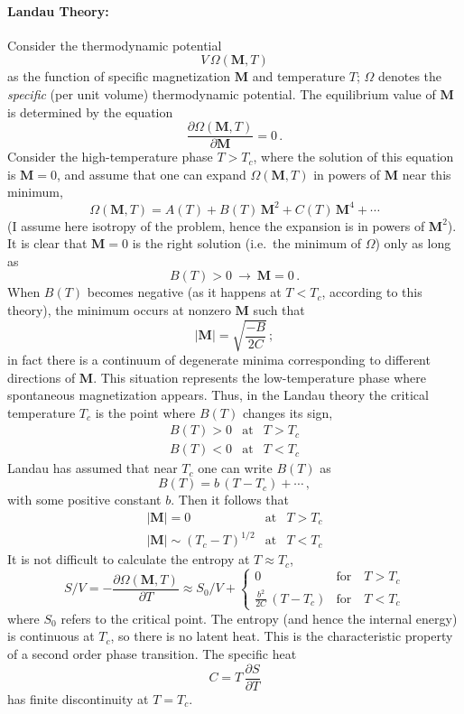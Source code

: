 \paragraph{Landau Theory:} Consider the thermodynamic potential
\[
V\,\Omega(\mathbf M,T)
\]
as the function of specific magnetization $\mathbf M$ and temperature $T$;
$\Omega$ denotes the \emph{specific} (per unit volume) thermodynamic potential.
The equilibrium value of $\mathbf M$ is determined by the equation
\[
\frac{\partial\Omega(\mathbf M,T)}{\partial\mathbf M}=0\,.
\]
Consider the high-temperature phase $T>T_c$, where the solution of this equation
is $\mathbf M=0$, and assume that one can expand $\Omega(\mathbf M,T)$ in powers
of $\mathbf M$ near this minimum,
\[
\Omega(\mathbf M,T)=A(T)+B(T)\,\mathbf M^2+C(T)\,\mathbf M^4+\cdots
\]
(I assume here isotropy of the problem, hence the expansion is in powers of
$\mathbf M^2$). It is clear that $\mathbf M=0$ is the right solution (i.e.\ the
minimum of $\Omega$) only as long as
\[
B(T)>0\ \to\ \mathbf M=0\,.
\]
When $B(T)$ becomes negative (as it happens at $T<T_c$, according to this
theory), the minimum occurs at nonzero $\mathbf M$ such that
\[
|\mathbf M|=\sqrt{\frac{-B}{2C}}\,;
\]
in fact there is a continuum of degenerate minima corresponding to different
directions of $\mathbf M$. This situation represents the low-temperature phase
where spontaneous magnetization appears. Thus, in the Landau theory the critical
temperature $T_c$ is the point where $B(T)$ changes its sign,
\[
\begin{array}{lll}
B(T)>0 & \text{at} & T>T_c\\
B(T)<0 & \text{at} & T<T_c
\end{array}
\]
Landau has assumed that near $T_c$ one can write $B(T)$ as
\[
B(T)=b\,(T-T_c)+\cdots\,,
\]
with some positive constant $b$. Then it follows that
\[
\begin{array}{lll}
|\mathbf M|=0 & \text{at} & T>T_c\\
|\mathbf M|\sim(T_c-T)^{1/2} & \text{at} & T<T_c
\end{array}
\]
It is not difficult to calculate the entropy at $T\approx T_c$,
\[
S/V=-\frac{\partial\Omega(\mathbf M,T)}{\partial T}\approx S_0/V+
\begin{cases}0 & \text{for}\quad T>T_c\\ \frac{b^2}{2C}\,(T-T_c) & \text{for}\quad T<T_c\end{cases}
\]
where $S_0$ refers to the critical point. The entropy (and hence the internal
energy) is continuous at $T_c$, so there is no latent heat. This is the
characteristic property of a second order phase transition. The specific heat
\[
C=T\,\frac{\partial S}{\partial T}
\]
has finite discontinuity at $T=T_c$.


